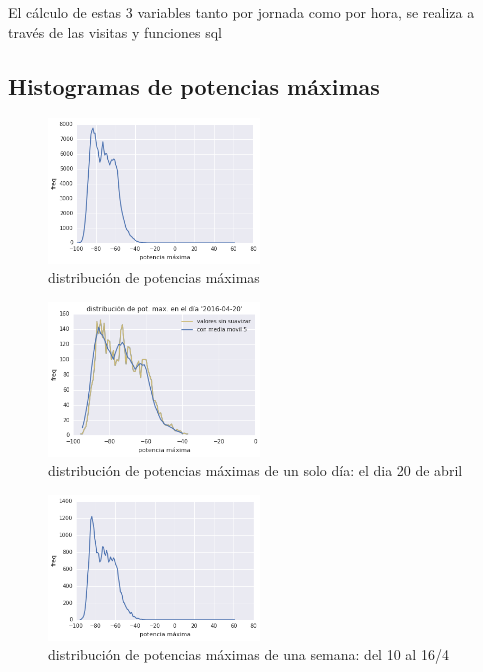 El cálculo de estas 3 variables tanto por jornada
como por hora,
se realiza a través de las visitas y funciones sql

\subsection{Histogramas de potencias máximas}
\begin{figure}[H] 
  \centering
  \includegraphics[width=0.5\textwidth]{pot_max.png}
  \caption{distribución de potencias máximas}
  \label{fig:pot_max_total}
\end{figure}

\begin{figure}[H] 
  \centering
  \includegraphics[width=0.5\textwidth]{pot_max_2016-04-20.png}
  \caption{distribución de potencias máximas de un solo día: el dia 20 de abril}
  \label{fig:pot_max_1_dia}
\end{figure}

\begin{figure}[H] 
  \centering
  \includegraphics[width=0.5\textwidth]{pot_max_2016-04-10_al_16.png}
  \caption{distribución de potencias máximas de una semana: del 10 al 16/4}
  \label{fig:pot_max_semana}
\end{figure}

